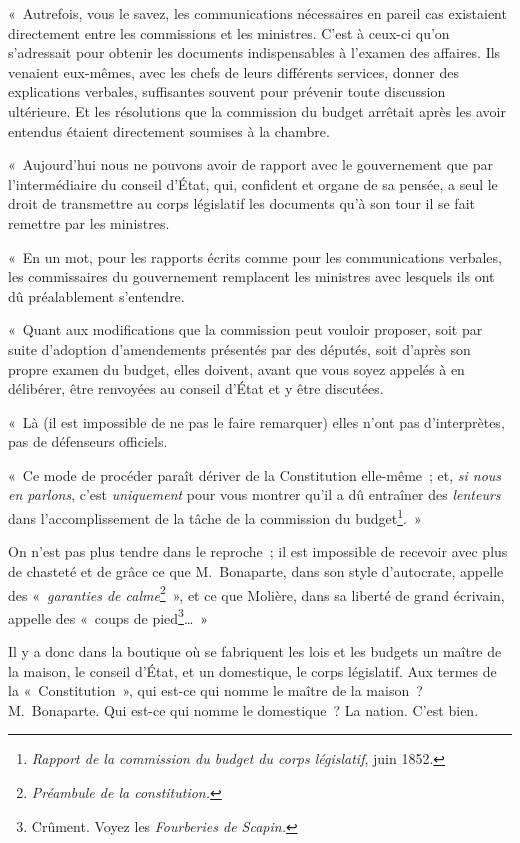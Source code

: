 \documentclass[french,twoside]{book} %
\newenvironment{quoteblock}%
  {\begin{quoting}}
  {\end{quoting}}
\newenvironment{quotebar}{%
    \def\FrameCommand{{\color{rubric!10!}\vrule width 0.5em} \hspace{0.9em}}%
    \def\OuterFrameSep{\itemsep} %
    \MakeFramed {\advance\hsize-\width \FrameRestore}
  }%
  {%
    \endMakeFramed
  }
\renewenvironment{quoteblock}%
  {%
    \savenotes
    \setstretch{0.9}
    \normalfont
    \begin{quotebar}
  }
  {%
    \end{quotebar}
    \spewnotes
  }
\begin{document}
\begin{quoteblock}
 \noindent « Autrefois, vous le savez, les communications nécessaires en pareil cas existaient directement entre les commissions et les ministres. C’est à ceux-ci qu’on s’adressait pour obtenir les documents indispensables à l’examen des affaires. Ils venaient eux-mêmes, avec les chefs de leurs différents services, donner des explications verbales, suffisantes souvent pour prévenir toute discussion ultérieure. Et les résolutions que la commission du budget arrêtait après les avoir entendus étaient directement soumises à la chambre.\par
 « Aujourd’hui nous ne pouvons avoir de rapport avec le gouvernement que par l’intermédiaire du conseil d’État, qui, confident et organe de sa pensée, a seul le droit de transmettre au corps législatif les documents qu’à son tour il se fait remettre par les ministres.\par
 « En un mot, pour les rapports écrits comme pour les communications verbales, les commissaires du gouvernement remplacent les ministres avec lesquels ils ont dû préalablement s’entendre.\par
 « Quant aux modifications que la commission peut vouloir proposer, soit par suite d’adoption d’amendements présentés par des députés, soit d’après son propre examen du budget, elles doivent, avant que vous soyez appelés à en délibérer, être renvoyées au conseil d’État et y être discutées.\par
 « Là (il est impossible de ne pas le faire remarquer) elles n’ont pas d’interprètes, pas de défenseurs officiels.\par
 « Ce mode de procéder paraît dériver de la Constitution elle-même ; et, \emph{si nous en parlons}, c’est \emph{uniquement} pour vous montrer qu’il a dû entraîner des \emph{lenteurs} dans l’accomplissement de la tâche de la commission du budget\footnote{\emph{Rapport de la commission du budget du corps législatif}, juin 1852.}. »
 \end{quoteblock}

\noindent On n’est pas plus tendre dans le reproche ; il est impossible de recevoir avec plus de chasteté et de grâce ce que M. Bonaparte, dans son style d’autocrate, appelle des « \emph{garanties de calme}\footnote{\emph{Préambule de la constitution.}} », et ce que Molière, dans sa liberté de grand écrivain, appelle des « coups de pied\footnote{Crûment. Voyez les \emph{Fourberies de Scapin.}}… »\par
Il y a donc dans la boutique où se fabriquent les lois et les budgets un maître de la maison, le conseil d’État, et un domestique, le corps législatif. Aux termes de la « Constitution », qui est-ce qui nomme le maître de la maison ? M. Bonaparte. Qui est-ce qui nomme le domestique ? La nation. C’est bien.
\end{document}

